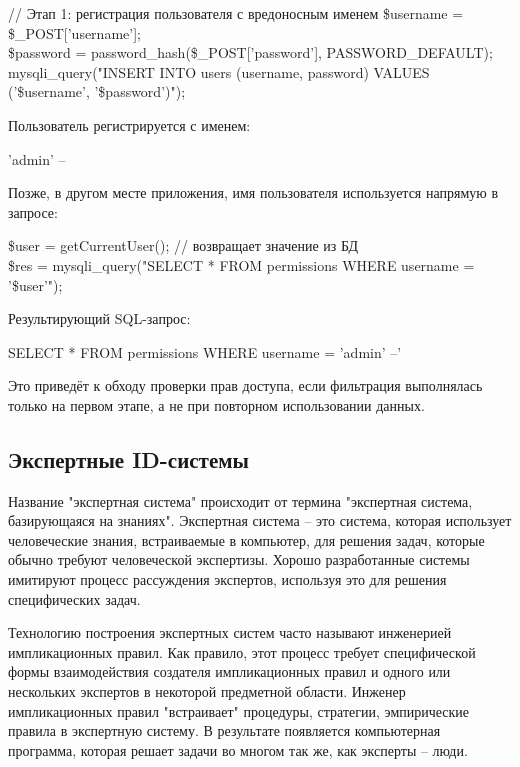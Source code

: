 \begin{itemize}
	\begin{grayquote}
		// Этап 1: регистрация пользователя с вредоносным именем
		\$username = \$\_POST['username'];\\
		\$password = password\_hash(\$\_POST['password'], PASSWORD\_DEFAULT);\\
		mysqli\_query("INSERT INTO users (username, password) VALUES ('\$username', '\$password')");
	\end{grayquote}

	Пользователь регистрируется с именем:
	\begin{grayquote}
		'admin' -- 
	\end{grayquote}

	Позже, в другом месте приложения, имя пользователя используется напрямую в запросе:

	\begin{grayquote}
		\$user = getCurrentUser(); // возвращает значение из БД\\
		\$res = mysqli\_query("SELECT * FROM permissions WHERE username = '\$user'");
	\end{grayquote}

	Результирующий SQL-запрос:

	\begin{grayquote}
		SELECT * FROM permissions WHERE username = 'admin' --'
	\end{grayquote}

	Это приведёт к обходу проверки прав доступа, если фильтрация выполнялась только на первом этапе, а не при повторном использовании данных.
		
    
\end{itemize}


\subsection{Экспертные ID-системы}

Название "экспертная система" происходит от термина "экспертная система, базирующаяся на знаниях". Экспертная система – это система, которая использует человеческие знания, встраиваемые в компьютер, для решения задач, которые обычно требуют человеческой экспертизы. Хорошо разработанные системы имитируют процесс рассуждения экспертов, используя это для решения специфических задач.

Технологию построения экспертных систем часто называют инженерией импликационных правил. Как правило,
этот процесс требует специфической формы взаимодействия создателя импликационных правил и одного
или нескольких экспертов в некоторой предметной области. Инженер импликационных правил "встраивает"
процедуры, стратегии, эмпирические правила в экспертную систему. В результате появляется
компьютерная программа, которая решает задачи во многом так же, как эксперты -- люди.
\autocite{IDSystem}

